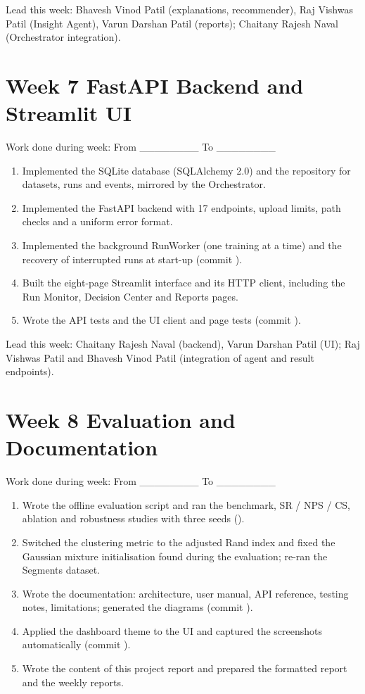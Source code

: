 Lead this week: Bhavesh Vinod Patil (explanations, recommender), Raj Vishwas Patil (Insight Agent), Varun Darshan Patil (reports); Chaitany Rajesh Naval (Orchestrator integration).

\FloatBarrier
\setcounter{secnumdepth}{0}
\section{Week 7 \textemdash{} FastAPI Backend and Streamlit UI}
\setcounter{secnumdepth}{2}

Work done during week: From \_\_\_\_\_\_\_\_ To \_\_\_\_\_\_\_\_

\begin{enumerate}
  \item Implemented the SQLite database (SQLAlchemy 2.0) and the repository for datasets, runs and events, mirrored by the Orchestrator.
  \item Implemented the FastAPI backend with 17 endpoints, upload limits, path checks and a uniform error format.
  \item Implemented the background RunWorker (one training at a time) and the recovery of interrupted runs at start-up (commit ).
  \item Built the eight-page Streamlit interface and its HTTP client, including the Run Monitor, Decision Center and Reports pages.
  \item Wrote the API tests and the UI client and page tests (commit ).
\end{enumerate}

Lead this week: Chaitany Rajesh Naval (backend), Varun Darshan Patil (UI); Raj Vishwas Patil and Bhavesh Vinod Patil (integration of agent and result endpoints).

\FloatBarrier
\setcounter{secnumdepth}{0}
\section{Week 8 \textemdash{} Evaluation and Documentation}
\setcounter{secnumdepth}{2}

Work done during week: From \_\_\_\_\_\_\_\_ To \_\_\_\_\_\_\_\_

\begin{enumerate}
  \item Wrote the offline evaluation script and ran the benchmark, SR / NPS / CS, ablation and robustness studies with three seeds ().
  \item Switched the clustering metric to the adjusted Rand index and fixed the Gaussian mixture initialisation found during the evaluation; re-ran the Segments dataset.
  \item Wrote the documentation: architecture, user manual, API reference, testing notes, limitations; generated the diagrams (commit ).
  \item Applied the dashboard theme to the UI and captured the screenshots automatically (commit ).
  \item Wrote the content of this project report and prepared the formatted report and the weekly reports.
\end{enumerate}

